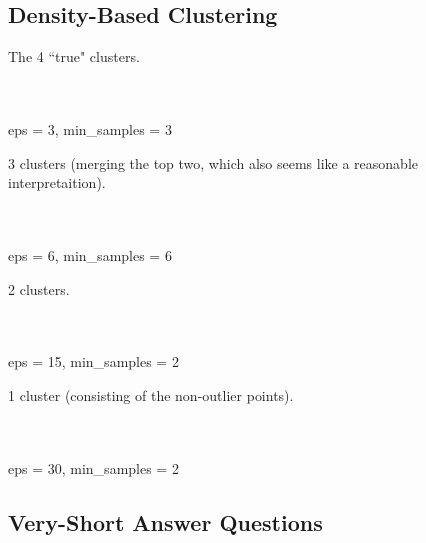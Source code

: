 \documentclass{article}
\def\blu#1{{\color{blu}#1}}
\def\enum#1{\begin{enumerate}#1\end{enumerate}}
\begin{document}
\subsection{Density-Based Clustering}

\enum{
\blu{\item The 4 ``true" clusters.} \\\\ eps = 3, min\_samples = 3
\blu{\item 3 clusters (merging the top two, which also seems like a reasonable interpretaition).} \\\\ eps = 6, min\_samples = 6
\blu{\item 2 clusters.} \\\\ eps = 15, min\_samples = 2
\blu{\item 1 cluster (consisting of the non-outlier points).} \\\\ eps = 30, min\_samples = 2
}



\subsection{Very-Short Answer Questions}
\end{document}
